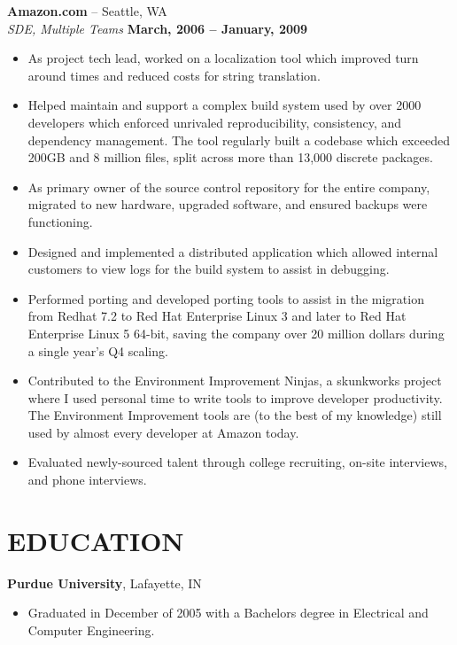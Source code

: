 \documentclass[line, margin]{res}
\begin{document}
\begin{resume}
{\bf Amazon.com} -- Seattle, WA
\\
\textit{SDE, Multiple Teams} \hfill {\bf March, 2006 -- January, 2009}
\\
\begin{itemize}
\item
As project tech lead, worked on a localization tool which improved turn around times and reduced
costs for string translation.
\item
Helped maintain and support a complex build system used by over 2000 developers
which enforced unrivaled reproducibility, consistency, and dependency
management.  The tool regularly built a codebase which exceeded 200GB and 8
million files, split across more than 13,000 discrete packages.
\item
As primary owner of the source control repository for the entire company,
migrated to new hardware, upgraded software, and ensured backups were
functioning.
\item
Designed and implemented a distributed application which allowed internal
customers to view logs for the build system to assist in debugging.
\item
Performed porting and developed porting tools to assist in the migration from
Redhat 7.2 to Red Hat Enterprise Linux 3 and later to Red Hat Enterprise Linux
5 64-bit, saving the company over 20 million dollars during a single year's Q4
scaling.
\item
Contributed to the Environment Improvement Ninjas, a skunkworks project where I
used personal time to write tools to improve developer productivity.  The
Environment Improvement tools are (to the best of my knowledge) still used by
almost every developer at Amazon today.
\item
Evaluated newly-sourced talent through college recruiting, on-site interviews,
and phone interviews.
\end{itemize}

\section{EDUCATION}

{\bf Purdue University}, Lafayette, IN
\begin{itemize}
\item
Graduated in December of 2005 with a Bachelors degree in Electrical and
Computer Engineering.
\end{itemize}


\end{resume}
\end{document}
